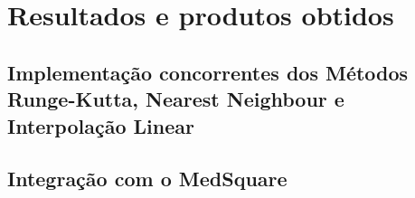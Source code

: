 \chapter{Resultados e produtos obtidos}

\section{Implementação concorrentes dos Métodos Runge-Kutta, Nearest Neighbour e Interpolação Linear}
\section{Integração com o MedSquare}
